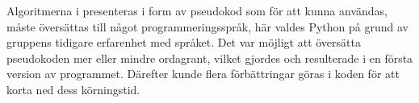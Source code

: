 
Algoritmerna i \cite{HaraldSieve} presenteras i form av pseudokod som för att kunna användas, måste översättas till något programmeringsspråk, här valdes Python på grund av gruppens tidigare erfarenhet med språket. Det var möjligt att översätta pseudokoden mer eller mindre ordagrant, vilket gjordes och resulterade i en första version av programmet. Därefter kunde flera förbättringar göras i koden för att korta ned dess körningstid. 



